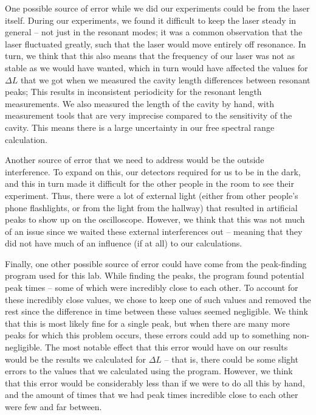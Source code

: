 \documentclass[twocolumn,amsmath,amssymb,pra]{revtex4-2}
\begin{document}
One possible source of error while we did our experiments could be from the laser itself. During our experiments, we found it difficult to keep the laser steady in general -- not just in the resonant modes; it was a common observation that the laser fluctuated greatly, such that the laser would move entirely off resonance. In turn, we think that this also means that the frequency of our laser was not as stable as we would have wanted, which in turn would have affected the values for $\Delta L$ that we got when we measured the cavity length differences between resonant peaks; This results in inconsistent periodicity for the resonant length measurements. We also measured the length of the cavity by hand, with measurement tools that are very imprecise compared to the sensitivity of the cavity. This means there is a large uncertainty in our free spectral range calculation.

Another source of error that we need to address would be the outside interference. To expand on this, our detectors required for us to be in the dark, and this in turn made it difficult for the other people in the room to see their experiment. Thus, there were a lot of external light (either from other people's phone flashlights, or from the light from the hallway) that resulted in artificial peaks to show up on the oscilloscope. However, we think that this was not much of an issue since we waited these external interferences out -- meaning that they did not have much of an influence (if at all) to our calculations.

Finally, one other possible source of error could have come from the peak-finding program used for this lab. While finding the peaks, the program found potential peak times -- some of which were incredibly close to each other. To account for these incredibly close values, we chose to keep one of such values and removed the rest since the difference in time between these values seemed negligible. We think that this is most likely fine for a single peak, but when there are many more peaks for which this problem occurs, these errors could add up to something non-negligible. 
The most notable effect that this error would have on our results would be the results we calculated for $\Delta L$ -- that is, there could be some slight errors to the values that we calculated using the program. However, we think that this error would be considerably less than if we were to do all this by hand, and the amount of times that we had peak times incredible close to each other were few and far between.
\end{document}
